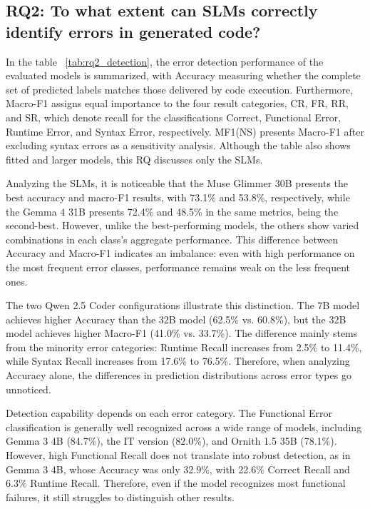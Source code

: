 \subsection{RQ2: To what extent can SLMs correctly identify errors in generated code?}
\label{sec:rq2}

In the table ~\ref{tab:rq2_detection}, the error detection performance of the evaluated models is summarized, with Accuracy measuring whether the complete set of predicted labels matches those delivered by code execution. Furthermore, Macro-F1 assigns equal importance to the four result categories, CR, FR, RR, and SR, which denote recall for the classifications Correct, Functional Error, Runtime Error, and Syntax Error, respectively. MF1(NS) presents Macro-F1 after excluding syntax errors as a sensitivity analysis. Although the table also shows fitted and larger models, this RQ discusses only the SLMs.

Analyzing the SLMs, it is noticeable that the Muse Glimmer 30B presents the best accuracy and macro-F1 results, with 73.1\% and 53.8\%, respectively, while the Gemma 4 31B presents 72.4\% and 48.5\% in the same metrics, being the second-best. However, unlike the best-performing models, the others show varied combinations in each class's aggregate performance. This difference between Accuracy and Macro-F1 indicates an imbalance: even with high performance on the most frequent error classes, performance remains weak on the less frequent ones.

The two Qwen 2.5 Coder configurations illustrate this distinction. The 7B model achieves higher Accuracy than the 32B model (62.5\% vs. 60.8\%), but the 32B model achieves higher Macro-F1 (41.0\% vs. 33.7\%). The difference mainly stems from the minority error categories: Runtime Recall increases from 2.5\% to 11.4\%, while Syntax Recall increases from 17.6\% to 76.5\%. Therefore, when analyzing Accuracy alone, the differences in prediction distributions across error types go unnoticed.

Detection capability depends on each error category. The Functional Error classification is generally well recognized across a wide range of models, including Gemma 3 4B (84.7\%), the IT version (82.0\%), and Ornith 1.5 35B (78.1\%). However, high Functional Recall does not translate into robust detection, as in Gemma 3 4B, whose Accuracy was only 32.9\%, with 22.6\% Correct Recall and 6.3\% Runtime Recall. Therefore, even if the model recognizes most functional failures, it still struggles to distinguish other results.



